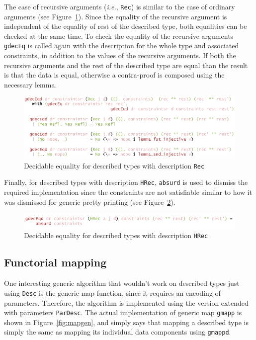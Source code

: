 \documentclass{ituthesis}
\newcommand{\ttconstructor}[1]{\textcolor{constructor-color}{\texttt{#1}}}
\newcommand{\tttype}[1]{\textcolor{type-color}{\texttt{#1}}}
\newcommand{\ttdec}[1]{\textcolor{declared-var-color}{\texttt{#1}}}
\theoremstyle{break}
\begin{document}
The case of recursive arguments (\textit{i.e.}, \ttconstructor{Rec}) is similar to the case of ordinary arguments (see Figure~\ref{fig:deceqgendesc3}).
Since the equality of the recursive argument is independent of the equality of rest of the described type, both equalities can be checked at the same time.
To check the equality of the recursive arguments \ttdec{gdecEq} is called again with the description for the whole type and associated constraints, in addition to the values
of the recursive arguments.
If both the recursive arguments and the rest of the described type are equal than the result is that the data is equal,
otherwise a contra-proof is composed using the necessary lemma.

\begin{figure}[ht]
\begin{center}
    \includegraphics[scale=0.5]{Figures/GenericDecEqDesc3.png}
\end{center}
\caption{Decidable equality for described types with description \ttconstructor{Rec}}
\label{fig:deceqgendesc3}
\end{figure}

Finally, for described types with description \ttconstructor{HRec}, \ttdec{absurd} is used to dismiss the required implementation since the constraints are not satisfiable similar to
how it was dismissed for generic pretty printing (see Figure~\ref{fig:deceqgendesc4}).

\begin{figure}[ht]
\begin{center}
    \includegraphics[scale=0.5]{Figures/GenericDecEqDesc4.png}
\end{center}
\caption{Decidable equality for described types with description \ttconstructor{HRec}}
\label{fig:deceqgendesc4}
\end{figure}

\subsection{Functorial mapping}
\label{sub:Functorial mapping}
One interesting generic algorithm that wouldn't work on described types just using \tttype{Desc} is the generic map function, since it requires
an encoding of parameters.
Therefore, the algorithm is implemented using the version extended with parameters \tttype{ParDesc}.
The actual implementation of generic map \ttdec{gmapp} is shown in Figure~\ref{fig:mapgen}, and simply says that
mapping a described type is simply the same as mapping its individual data components using \ttdec{gmappd}.
\end{document}
